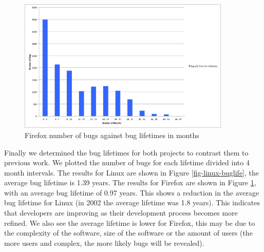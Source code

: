 \begin{figure}
\begin{center}
\includegraphics[width=0.9\textwidth]{firefox_bug_life.png}
\end{center}
\caption{Firefox number of bugs against bug lifetimes in months}
\label{fig-firefox-buglife}
\end{figure}

Finally we determined the bug lifetimes for both projects to contrast
them to previous work. We plotted the number of bugs for each lifetime
divided into 4 month intervals. The results for Linux are shown in
Figure \ref{fig-linux-buglife}, the average bug lifetime is 1.39
years. The results for Firefox are shown in Figure
\ref{fig-firefox-buglife}, with an average bug lifetime of 0.97
years. This shows a reduction in the average bug lifetime for Linux (in
2002 the average lifetime was 1.8 years). This indicates that
developers are improving as their development process becomes more
refined. We also see the average lifetime is lower for Firefox, this
may be due to the complexity of the software, size of the software or
the amount of users (the more users and complex, the more likely bugs will be
revealed).



